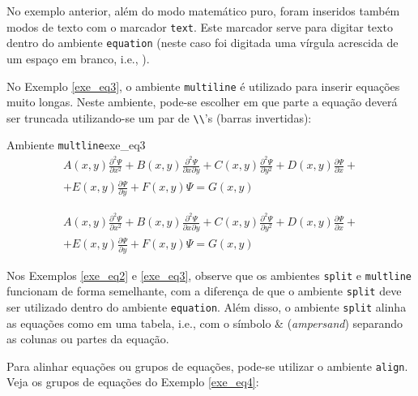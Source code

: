 No exemplo anterior, além do modo matemático puro, foram inseridos também modos de texto com o marcador {\tt text}. Este marcador serve para digitar texto dentro do ambiente {\tt equation} (neste caso foi digitada uma vírgula acrescida de um espaço em branco, i.e., \texttt{\text{, }}).

No Exemplo \ref{exe_eq3}, o ambiente {\tt multiline} é utilizado para inserir equações muito longas. Neste ambiente, pode-se escolher em que parte a equação deverá ser truncada utilizando-se um par de \verb|\\|'s (barras invertidas):

\begin{texexptitled}[breakable,center lower,enhanced,middle=2mm]{Ambiente {\tt multline}}{exe_eq3}
\begin{multline*}
  A(x,y)\frac{\partial^2{\Psi}}{\partial{x^2}}           + 
  B(x,y)\frac{\partial^2{\Psi}}{\partial{x}\partial{y}}  +
  C(x,y)\frac{\partial^2{\Psi}}{\partial{y^2}}           +
  D(x,y)\frac{\partial{\Psi}}{\partial{x}}               + \\
+ E(x,y)\frac{\partial{\Psi}}{\partial{y}}               +
  F(x,y)\Psi = G(x,y)
\end{multline*}

\begin{multline}
  A(x,y)\frac{\partial^2{\Psi}}{\partial{x^2}}           + 
  B(x,y)\frac{\partial^2{\Psi}}{\partial{x}\partial{y}}  +
  C(x,y)\frac{\partial^2{\Psi}}{\partial{y^2}}           +
  D(x,y)\frac{\partial{\Psi}}{\partial{x}}               + \\
+ E(x,y)\frac{\partial{\Psi}}{\partial{y}}               +
  F(x,y)\Psi = G(x,y)
\end{multline}
\end{texexptitled}

Nos Exemplos \ref{exe_eq2} e \ref{exe_eq3}, observe que os ambientes {\tt split} e {\tt multline} funcionam de forma semelhante, com a diferença de que o ambiente {\tt split} deve ser utilizado dentro do ambiente {\tt equation}. Além disso, o ambiente {\tt split} alinha as equações como em uma tabela, i.e., com o símbolo \& (\textit{ampersand}) separando as colunas ou partes da equação.

Para alinhar equações ou grupos de equações, pode-se utilizar o ambiente {\tt align}. Veja os grupos de equações do Exemplo \ref{exe_eq4}:

